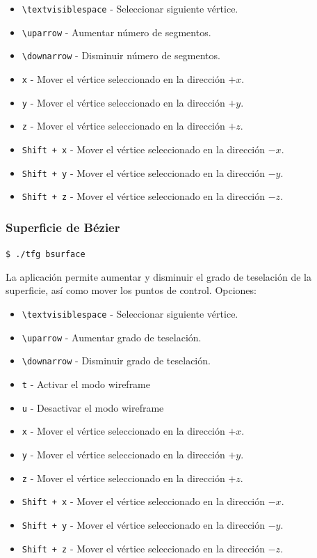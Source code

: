 \begin{itemize}
		\item \verb|\textvisiblespace| - Seleccionar siguiente vértice.
		\item \verb|\uparrow| - Aumentar número de segmentos.
		\item \verb|\downarrow| - Disminuir número de segmentos.
		\item \verb|x| - Mover el vértice seleccionado en la dirección $+x$.
		\item \verb|y| - Mover el vértice seleccionado en la dirección $+y$.
		\item \verb|z| - Mover el vértice seleccionado en la dirección $+z$.
		\item \verb|Shift + x| - Mover el vértice seleccionado en la dirección $-x$.
		\item \verb|Shift + y| - Mover el vértice seleccionado en la dirección $-y$.
		\item \verb|Shift + z| - Mover el vértice seleccionado en la dirección $-z$.
\end{itemize}

\subsubsection{Superficie de Bézier}

\verb|$ ./tfg bsurface|

La aplicación permite aumentar y disminuir el grado de teselación de la
superficie, así como mover los puntos de control.  
Opciones:

\begin{itemize}
		\item \verb|\textvisiblespace| - Seleccionar siguiente vértice.
		\item \verb|\uparrow| - Aumentar grado de teselación.
		\item \verb|\downarrow| - Disminuir grado de teselación.
		\item \verb|t| - Activar el modo wireframe
		\item \verb|u| - Desactivar el modo wireframe
		\item \verb|x| - Mover el vértice seleccionado en la dirección $+x$.
		\item \verb|y| - Mover el vértice seleccionado en la dirección $+y$.
		\item \verb|z| - Mover el vértice seleccionado en la dirección $+z$.
		\item \verb|Shift + x| - Mover el vértice seleccionado en la dirección $-x$.
		\item \verb|Shift + y| - Mover el vértice seleccionado en la dirección $-y$.
		\item \verb|Shift + z| - Mover el vértice seleccionado en la dirección $-z$.
\end{itemize}

